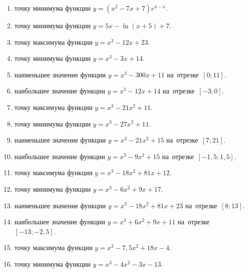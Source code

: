 \documentclass[a4paper,10pt]{article}
\begin{document}
\begin{enumerate}
\item {} точку минимума функции $y=\left(x^2-7x+7\right){{e}^{4-x}}$.

\item {} точку минимума функции $y=5x-\ln \left(x+5\right)+7$.

\item {} точку максимума функции $y=x^3 -12x +23$.

\item {} точку минимума функции $y=x^3 -3x+14$.

\item {} наименьшее значение функции $y=x^3 -300x+11$ на~отрезке~$\left[0;11\right]$.

\item {} наибольшее значение функции $y=x^3 -12x+14$ на~отрезке~$\left[-3;0\right]$.

\item {} точку максимума функции $y=x^3 -21x^2+11$.

\item {} точку минимума функции $y=x^3 -27x^2+11$.

\item {} наименьшее значение функции $y=x^3 -21x^2+15$ на~отрезке~$\left[7;21\right]$.

\item {} наибольшее значение функции $y=x^3 -9x^2+15$ на~отрезке~$\left[-1,5;1,5\right]$.

\item {} точку максимума функции $y=x^3 -18x^2+81x+12$.

\item {} точку минимума функции $y=x^3 -6x^2+9x+17$.

\item {} наименьшее значение функции $y=x^3 -18x^2+81x+23$ на~отрезке~$\left[8;13\right]$.

\item {} наибольшее значение функции $y=x^3 +6x^2+9x+11$ на~отрезке~$\left[-13;-2,5\right]$.

\item {} точку максимума функции $y=x^3 -7,5x^2+18x-4$.

\item {} точку минимума функции $y=x^3 -4x^2-3x-13$.


\end{enumerate}
\end{document}
